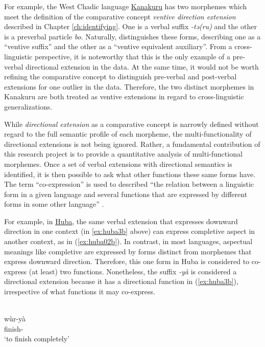 For example, the West Chadic language \hyperref[kana]{Kanakuru} has two morphemes which meet the definition of the comparative concept \textit{ventive direction extension} described in Chapter \ref{ch:identifying}. One is a verbal suffix \textit{-tə(ru)} and the other is a preverbal particle \textit{bo}. Naturally, \citet{newmanKanakuruLanguage1974} distinguishes these forms, describing one as a ``ventive suffix'' and the other as a ``ventive equivalent auxiliary''. From a cross-linguistic perspective, it is noteworthy that this is the only example of a pre-verbal directional extension in the data. At the same time, it would not be worth refining the comparative concept to distinguish pre-verbal and post-verbal extensions for one outlier in the data. Therefore, the two distinct morphemes in Kanakuru are both treated as ventive extensions in regard to cross-linguistic generalizations.

While \textit{directional extension} as a comparative concept is narrowly defined without regard to the full semantic profile of each morpheme, the multi-functionality of directional extensions is not being ignored. Rather, a fundamental contribution of this research project is to provide a quantitative analysis of multi-functional morphemes. Once a set of verbal extensions with directional semantics is identified, it is then possible to ask what other functions these same forms have. The term ``co-expression'' is used to described ``the relation between a linguistic form in a given language and several functions that are expressed by different forms in some other language'' \citep[476]{hartmannIdentifyingSemanticRole2016}. 

For example, in \hyperref[huba]{Huba}, the same verbal extension that expresses downward direction in one context (in \ref{ex:huba3b} above) can express completive aspect in another context, as in (\ref{ex:huba02b}). In contrast, in most languages, aspectual meanings like completive are expressed by forms distinct from morphemes that express downward direction. Therefore, this one form in Huba is considered to co-express (at least) two functions. Nonetheless, the suffix \textit{-yà} is considered a directional extension because it has a directional function in (\ref{ex:huba3b}), irrespective of what functions it may co-express.

\ea\label{ex:huba02b}
 \\
\gll wùr-yà	\\
finish-	\\
\glt `to finish completely'
\z 

